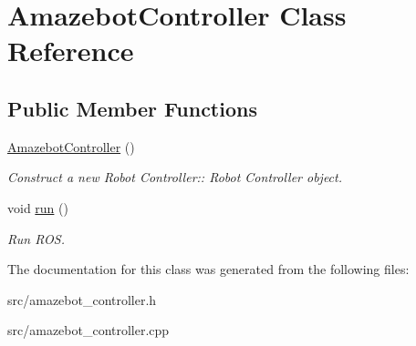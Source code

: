 \hypertarget{class_amazebot_controller}{}\section{Amazebot\+Controller Class Reference}
\label{class_amazebot_controller}
\subsection*{Public Member Functions}
\begin{DoxyCompactItemize}
\item 
\mbox{\label{class_amazebot_controller_a95c82b4afdd31913b750f4819b80ad8d}} 
\hyperlink{class_amazebot_controller_a95c82b4afdd31913b750f4819b80ad8d}{Amazebot\+Controller} ()
\begin{DoxyCompactList}\small\item\em Construct a new Robot Controller\+:\+: Robot Controller object. \end{DoxyCompactList}\item 
\mbox{\label{class_amazebot_controller_ad2398a96ae23d70b41ead7f5c42a1765}} 
void \hyperlink{class_amazebot_controller_ad2398a96ae23d70b41ead7f5c42a1765}{run} ()
\begin{DoxyCompactList}\small\item\em Run R\+OS. \end{DoxyCompactList}\end{DoxyCompactItemize}


The documentation for this class was generated from the following files\+:\begin{DoxyCompactItemize}
\item 
src/amazebot\+\_\+controller.\+h\item 
src/amazebot\+\_\+controller.\+cpp\end{DoxyCompactItemize}
